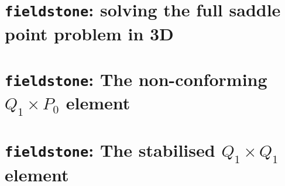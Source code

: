 \documentclass[a4paper]{article}
\begin{document}
\newpage
\section{{\tt fieldstone}: solving the full saddle point problem in 3D}


\newpage
\section{{\tt fieldstone}: The non-conforming $Q_1 \times P_0$ element} 


\newpage
\section{{\tt fieldstone}: The stabilised $Q_1 \times Q_1$ element} 

\end{document}
